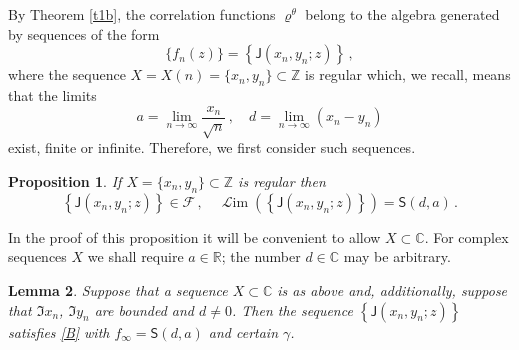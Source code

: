 \documentclass[12pt]{amsart}
\newcommand{\J}{\mathsf{J}}
\newcommand{\brh}{\boldsymbol{\varrho}}
\newcommand{\Z}{\mathbb{Z}}
\newcommand{\R}{\mathbb{R}}
\newcommand{\C}{\mathbb{C}}
\newcommand{\bS}{\mathsf{S}}
\newcommand{\Lim}{\operatorname{\mathcal{ L}im}}
\newcommand{\g}{\gamma}
\newcommand{\aF}{\mathcal{F}}
\newcommand{\ix}{\theta}
\theoremstyle{plain}
\newtheorem{lemma}{Lemma}[section]
\newtheorem{proposition}[lemma]{Proposition}
\theoremstyle{definition}
\numberwithin{equation}{section}
\begin{document}
By Theorem \ref{t1b},  the correlation 
functions $\brh^\ix$ belong to the algebra generated by
sequences of the form
%
\begin{equation*}
\{f_n(z)\}=\left\{\J(x_n,y_n;z)\right\}\,,   
\end{equation*}
%
where the sequence  $X=X(n)=\{x_n,y_n\}\subset \Z$ is regular which,
we recall, means that the limits 
%
\begin{equation*}
a=\lim_{n\to\infty} \frac{x_n}{\sqrt{n}}\,, \quad d=\lim_{n\to\infty}  (x_n-y_n) 
\end{equation*}
%
exist, finite or infinite. 
Therefore, we first consider such sequences. 

\begin{proposition}\label{p34} 
If $X=\{x_n,y_n\}\subset\Z$ is regular then 
%
\begin{equation*}
\left\{\J(x_n,y_n;z)\right\}\in\aF\,, \quad 
\Lim\left(\left\{\J(x_n,y_n;z)\right\}\right)= \bS(d,a) \,.
\end{equation*}
%
\end{proposition} 

In the proof of this proposition it will be convenient to allow $X\subset \C$.
For complex sequences $X$ we shall require $a\in\R$; the number $d\in\C$
may be arbitrary. 

\begin{lemma}\label{l35}  
Suppose that a sequence $X\subset\C$
is as above and, additionally, suppose that $\Im x_n$, $\Im y_n$ are 
bounded and $d\ne 0$. Then the sequence $\left\{\J(x_n,y_n;z)\right\}$ 
satisfies \eqref{B}  with $f_\infty = \bS(d,a)$ and certain $\g$. 
\end{lemma}
\end{document}
